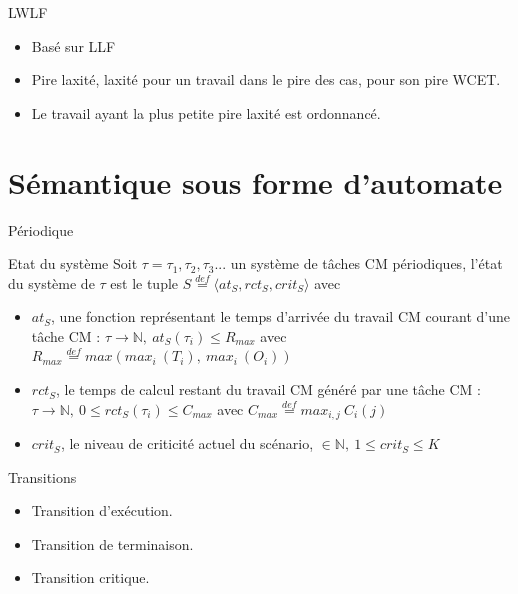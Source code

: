 \documentclass{bredelebeamer}
\begin{document}
\begin{frame}{LWLF}

\begin{itemize}
\item Basé sur LLF
\item Pire laxité, laxité pour un travail dans le pire des cas, pour son pire WCET.
\item Le travail ayant la plus petite pire laxité est ordonnancé.
\end{itemize}

\end{frame}

\section[Réduction]{Sémantique sous forme d'automate}

\begin{frame}{Périodique}
\begin{block}{Etat du système}
Soit $\tau = \tau_1, \tau_2, \tau_3 ...$ un système de tâches CM périodiques, l'état du système de $\tau$ est le tuple $S \overset{def}{=} \langle at_S, rct_S, crit_S\rangle$ avec
\begin{itemize}
\item $at_S$, une fonction représentant le temps d'arrivée du travail CM courant d'une tâche CM : $\tau \rightarrow \mathbb{N},\ at_S(\tau_i) \leq R_{max}$ avec $R_{max} \overset{def}{=} max(max_i\ (T_i),\ max_i\ (O_i))$
\item $rct_S$, le temps de calcul restant du travail CM généré par une tâche CM : $ \tau \rightarrow \mathbb{N},\ 0 \leq rct_S(\tau_i) \leq C_{max}$ avec $C_{max} \overset{def}{=} max_{i,j}\ C_i(j)$
\item $crit_S$, le niveau de criticité actuel du scénario, $ \in \mathbb{N},\ 1 \leq crit_S \leq K$\\
\end{itemize}
\end{block}

\begin{block}{Transitions}
\begin{itemize}
\item Transition d'exécution.
\item Transition de terminaison.
\item Transition critique.
\end{itemize}
\end{block}
\end{frame}
\end{document}
